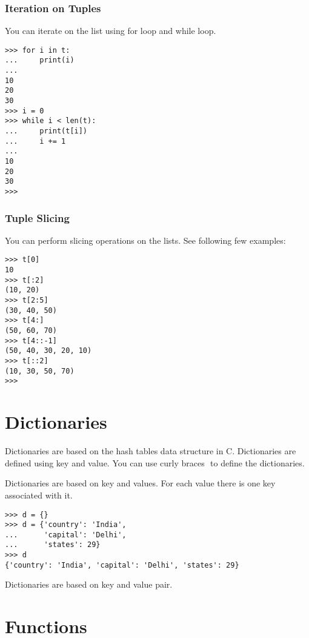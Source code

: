 \documentclass[letterpaper,12pt]{book}
\begin{document}
\subsubsection{Iteration on Tuples}
You can iterate on the list using for loop and while loop.
\begin{verbatim}
>>> for i in t:
...     print(i)
... 
10
20
30
>>> i = 0
>>> while i < len(t):
...     print(t[i])
...     i += 1
... 
10
20
30
>>> 
\end{verbatim}
\subsubsection{Tuple Slicing}
You can perform slicing operations on the lists. See following few examples:
\begin{verbatim}
>>> t[0]
10
>>> t[:2]
(10, 20)
>>> t[2:5]
(30, 40, 50)
>>> t[4:]
(50, 60, 70)
>>> t[4::-1]
(50, 40, 30, 20, 10)
>>> t[::2]
(10, 30, 50, 70)
>>> 
\end{verbatim}
\section{Dictionaries}
Dictionaries are based on the hash tables data structure in C. Dictionaries are defined using key and value. You can use curly braces ${}$ to define the dictionaries.

Dictionaries are based on key and values. For each value there is one  key associated with it. 
\begin{verbatim}
>>> d = {}
>>> d = {'country': 'India', 
...      'capital': 'Delhi', 
...      'states': 29}
>>> d
{'country': 'India', 'capital': 'Delhi', 'states': 29}
\end{verbatim}
Dictionaries are based on key and value pair.

\section{Functions}
%
%
%
\end{document}
